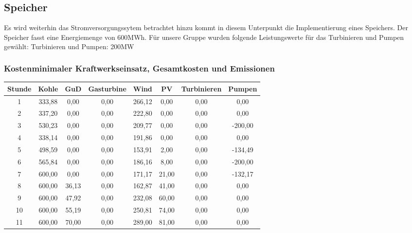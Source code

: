 \documentclass{eegreport}
\begin{document}
\newpage
\subsection{Speicher}

Es wird weiterhin das Stromversorgungssytem betrachtet hinzu kommt in diesem Unterpunkt die Implementierung eines Speichers. Der Speicher fasst eine Energiemenge von 600MWh.
Für unsere Gruppe wurden folgende Leistungswerte für das Turbinieren und Pumpen gewählt:
Turbinieren und Pumpen: 200MW

\subsubsection{Kostenminimaler Kraftwerkseinsatz, Gesamtkosten und Emissionen}


\begin{table}[h]
\begin{center}
\begin{tabular}{|c|c|c|c|c|c|c|c|}
\hline 
\textbf{Stunde} & \textbf{Kohle}  & \textbf{GuD} & \textbf{Gasturbine} & \textbf{Wind} & \textbf{PV} & \textbf{Turbinieren} & \textbf{Pumpen}  \\
\hline 
1      & 333,88 & 0,00   & 0,00       & 266,12 & 0,00  & 0,00        & 0,00    \\
\hline 
2      & 337,20 & 0,00   & 0,00       & 222,80 & 0,00  & 0,00        & 0,00    \\
\hline 
3      & 530,23 & 0,00   & 0,00       & 209,77 & 0,00  & 0,00        & -200,00 \\
\hline 
4      & 338,14 & 0,00   & 0,00       & 191,86 & 0,00  & 0,00        & 0,00    \\
\hline 
5      & 498,59 & 0,00   & 0,00       & 153,91 & 2,00  & 0,00        & -134,49 \\
\hline 
6      & 565,84 & 0,00   & 0,00       & 186,16 & 8,00  & 0,00        & -200,00 \\
\hline 
7      & 600,00 & 0,00   & 0,00       & 171,17 & 21,00 & 0,00        & -132,17 \\
\hline 
8      & 600,00 & 36,13  & 0,00       & 162,87 & 41,00 & 0,00        & 0,00    \\
\hline 
9      & 600,00 & 47,92  & 0,00       & 232,08 & 60,00 & 0,00        & 0,00    \\
\hline 
10     & 600,00 & 55,19  & 0,00       & 250,81 & 74,00 & 0,00        & 0,00    \\
\hline 
11     & 600,00 & 70,00  & 0,00       & 289,00 & 81,00 & 0,00        & 0,00    \\

\end{tabular}
\end{center}
\end{table}
\end{document}
